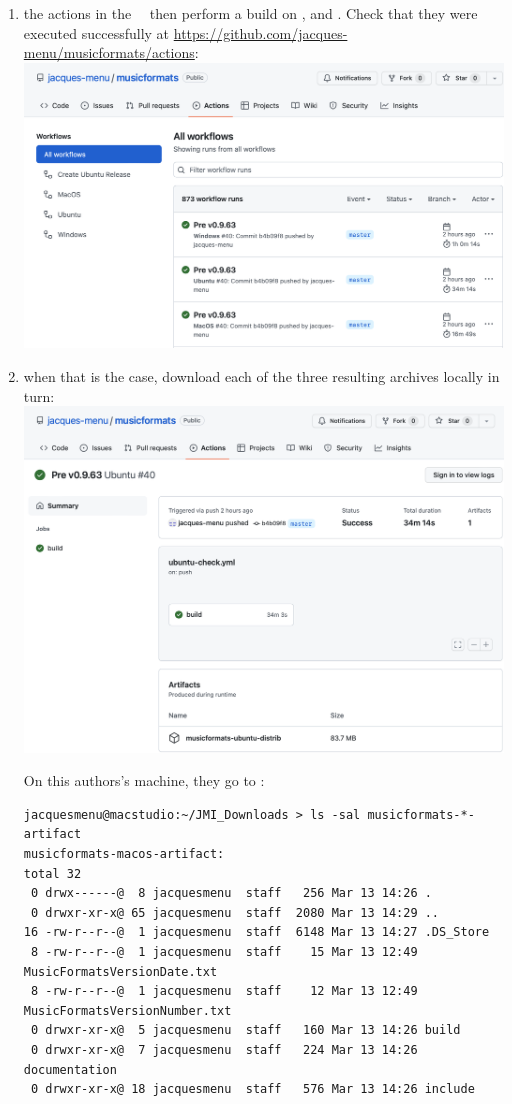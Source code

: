 \begin{enumerate}
\item the actions in the \mf\ \repo\ then perform a build on \Linux, \Windows and \MacOS. Check that they were executed successfully at \url{https://github.com/jacques-menu/musicformats/actions}:\\
\includegraphics[scale=0.5]{../mfgraphics/mfgraphicsSuccessfulActions.png}


\item when that is the case, download each of the three resulting  archives locally in turn:\\
\includegraphics[scale=0.5]{../mfgraphics/mfgraphicsDownloadDistribution.png}

On this authors's machine, they go to :
\begin{lstlisting}[language=Terminal]
jacquesmenu@macstudio:~/JMI_Downloads > ls -sal musicformats-*-artifact
musicformats-macos-artifact:
total 32
 0 drwx------@  8 jacquesmenu  staff   256 Mar 13 14:26 .
 0 drwxr-xr-x@ 65 jacquesmenu  staff  2080 Mar 13 14:29 ..
16 -rw-r--r--@  1 jacquesmenu  staff  6148 Mar 13 14:27 .DS_Store
 8 -rw-r--r--@  1 jacquesmenu  staff    15 Mar 13 12:49 MusicFormatsVersionDate.txt
 8 -rw-r--r--@  1 jacquesmenu  staff    12 Mar 13 12:49 MusicFormatsVersionNumber.txt
 0 drwxr-xr-x@  5 jacquesmenu  staff   160 Mar 13 14:26 build
 0 drwxr-xr-x@  7 jacquesmenu  staff   224 Mar 13 14:26 documentation
 0 drwxr-xr-x@ 18 jacquesmenu  staff   576 Mar 13 14:26 include


\end{lstlisting}
\end{enumerate}
